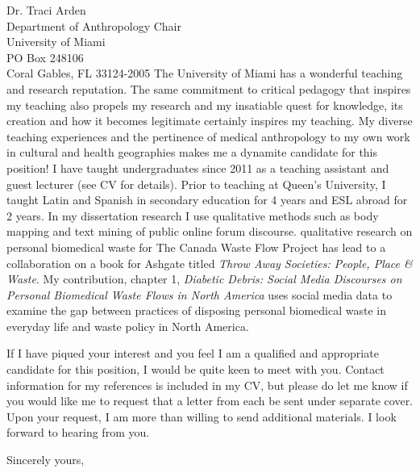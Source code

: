 \documentclass[10.5pt]{letter} %
\begin{document}
\begin{letter}{Dr. Traci Arden \\
Department of Anthropology Chair \\
University of Miami \\
PO Box 248106 \\
Coral Gables, FL 33124-2005}
The University of Miami has a wonderful teaching and research reputation. The same commitment to critical pedagogy that inspires my teaching also propels my research and my insatiable quest for knowledge, its creation and how it becomes legitimate certainly inspires my teaching. My diverse teaching experiences and the pertinence of medical anthropology to my own work in cultural and health geographies makes me a dynamite candidate for this position! 
I have taught undergraduates since 2011 as a teaching assistant and guest lecturer (see CV for details). Prior to teaching at Queen's University, I taught Latin and Spanish in secondary education for 4 years and ESL abroad for 2 years. 
In my dissertation research I use qualitative methods such as body mapping and text mining of public online forum discourse. qualitative research on personal biomedical waste for The Canada Waste Flow Project has lead to a collaboration on a book for Ashgate titled \textit{Throw Away Societies: People, Place \& Waste}. My contribution, chapter 1, \textit{Diabetic Debris: Social Media Discourses on Personal Biomedical Waste Flows in North America} uses social media data to examine the gap between practices of disposing personal biomedical waste in everyday life and waste policy in North America. 
 
If I have piqued your interest and you feel I am a qualified and appropriate candidate for this position, I would be quite keen to meet with you. Contact information for my references is included in my CV, but please do let me know if you would like me to request that a letter from each be sent under separate cover. Upon your request, I am more than willing to send additional materials. I look forward to hearing from you.

\closing{Sincerely yours,}




\end{letter}
\end{document}
